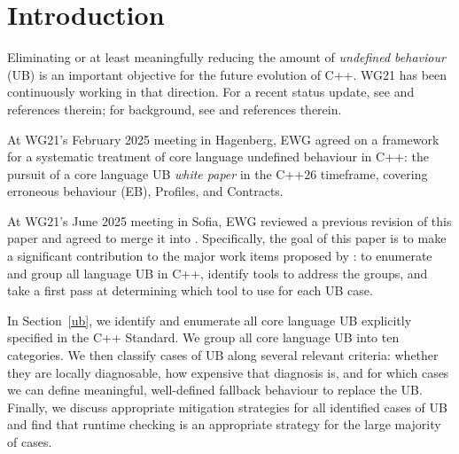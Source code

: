 


\section{Introduction}
\label{intro}

Eliminating or at least meaningfully reducing the amount of \emph{undefined behaviour} (UB) is an important objective for the future evolution of C++. WG21 has been continuously working in that direction. For a recent status update, see \cite{Sutter2025} and references therein; for background, see \cite{Sutter2024} and references therein.

At WG21's February 2025 meeting in Hagenberg, EWG agreed on a framework for a systematic
treatment of core language undefined behaviour in C++: the pursuit of a core language UB \emph{white paper} \cite{P3656R1} in the C++26 timeframe, covering erroneous behaviour (EB), Profiles, and Contracts.

At WG21's June 2025 meeting in Sofia, EWG reviewed a previous revision of this paper and agreed to merge it into \cite{P3656R1}. Specifically, the goal of this paper is to make a significant contribution to the major work items proposed by \cite{P3656R1}:  to enumerate and group all language UB in C++, identify tools to address the groups, and take a first pass at determining which tool to use for each UB case. 

In Section~\ref{ub}, we identify and enumerate all core language UB explicitly specified in the C++ Standard. We group all core language UB into ten categories. We then classify cases of UB along several relevant criteria: whether they are locally diagnosable, how expensive that diagnosis is, and for which cases we can define meaningful, well-defined fallback behaviour to replace the UB. Finally, we discuss appropriate mitigation strategies for all identified cases of UB and find that runtime checking is an appropriate strategy for the large majority of cases.

